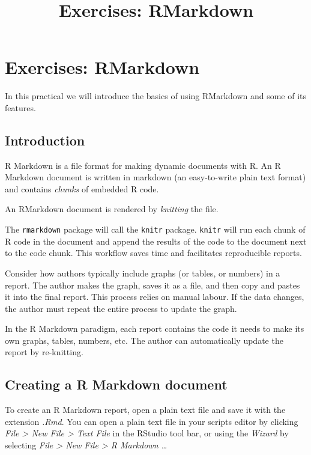 \documentclass[
]{article}
\title{Exercises: RMarkdown}
\author{}
\date{\vspace{-2.5em}}
\begin{document}
\maketitle

\hypertarget{exercises-rmarkdown}{%
\section{Exercises: RMarkdown}\label{exercises-rmarkdown}}

In this practical we will introduce the basics of using RMarkdown and
some of its features.

\hypertarget{introduction}{%
\subsection{Introduction}\label{introduction}}

R Markdown is a file format for making dynamic documents with R. An R
Markdown document is written in markdown (an easy-to-write plain text
format) and contains \emph{chunks} of embedded R code.

An RMarkdown document is rendered by \emph{knitting} the file.

The \texttt{rmarkdown} package will call the \texttt{knitr} package.
\texttt{knitr} will run each chunk of R code in the document and append
the results of the code to the document next to the code chunk. This
workflow saves time and facilitates reproducible reports.

Consider how authors typically include graphs (or tables, or numbers) in
a report. The author makes the graph, saves it as a file, and then copy
and pastes it into the final report. This process relies on manual
labour. If the data changes, the author must repeat the entire process
to update the graph.

In the R Markdown paradigm, each report contains the code it needs to
make its own graphs, tables, numbers, etc. The author can automatically
update the report by re-knitting.

\hypertarget{creating-a-r-markdown-document}{%
\subsection{Creating a R Markdown
document}\label{creating-a-r-markdown-document}}

To create an R Markdown report, open a plain text file and save it with
the extension \emph{.Rmd}. You can open a plain text file in your
scripts editor by clicking \emph{File \textgreater{} New File
\textgreater{} Text File} in the RStudio tool bar, or using the
\emph{Wizard} by selecting \emph{File \textgreater{} New File
\textgreater{} R Markdown \ldots{}}
\end{document}
